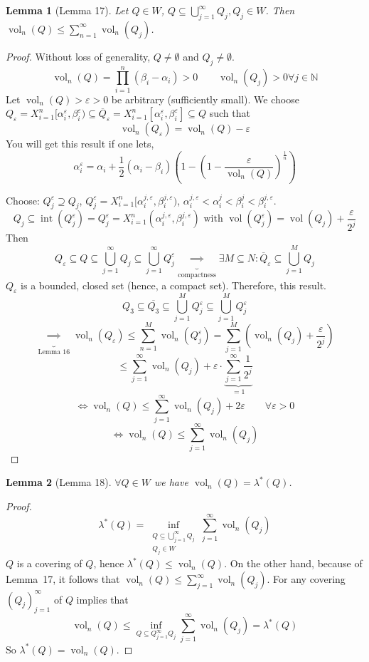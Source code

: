 \documentclass{article}
\newtheorem{lemma}{Lemma}  \numberwithin{lemma}{section}
\DeclareMathOperator{\vol}{vol}  %
\begin{document}
\begin{lemma}[Lemma 17]
  Let $Q \in W$, $Q \subseteq \bigcup_{j=1}^\infty Q_j, Q_j \in W$.
  Then $\vol_n(Q) \leq \sum_{n=1}^{\infty} \vol_n(Q_j)$.
\end{lemma}

\begin{proof}
  Without loss of generality, $Q \neq \emptyset$ and $Q_j \neq \emptyset$.
  \[ \vol_n(Q) = \prod_{i=1}^n (\beta_i - \alpha_i) > 0 \qquad \vol_n(Q_j) > 0 \forall j \in \mathbb N \]
  Let $\vol_n(Q) > \varepsilon > 0$ be arbitrary (sufficiently small).
  We choose $Q_{\varepsilon} = X_{i=1}^n [\alpha_i^\varepsilon, \beta_i^\varepsilon) \subseteq \overline{Q}_\varepsilon = X_{i=1}^n [\alpha_i^\varepsilon, \beta_i^\varepsilon] \subseteq Q$ such that
  \[ \vol_n(Q_\varepsilon) = \vol_n(Q) - \varepsilon \]
  You will get this result if one lets,
  \[ \alpha_i^\varepsilon = \alpha_i + \frac12(\alpha_i - \beta_i)\left(1 - (1 - \frac{\varepsilon}{\vol_n(Q)})^\frac1n\right) \]

  Choose: $Q_j^\varepsilon \supseteq Q_j$, $Q_j^\varepsilon = X_{i=1}^n [\alpha_i^{j,\varepsilon}, \beta_i^{j,\varepsilon})$, $\alpha_i^{j,\varepsilon} < \alpha_i^j < \beta_i^j < \beta_i^{j,\varepsilon}$.
  \[ Q_j \subseteq \operatorname{int}(Q_j^\varepsilon) = Q_j^\varepsilon = X_{i=1}^n (\alpha_i^{j,\varepsilon}, \beta_i^{j,\varepsilon}) \text{ with } \vol(Q_j^\varepsilon) = \vol(Q_j) + \frac{\varepsilon}{2^j} \]
  Then
  \[
    Q_\varepsilon \subseteq Q \subseteq \bigcup_{j=1}^\infty Q_j \subseteq \bigcup_{j=1}^\infty Q_j^\varepsilon
    \underbrace{\implies}_{\text{compactness}} \exists M \subseteq N: \overline{Q}_\varepsilon \subseteq \bigcup_{j=1}^M Q_j
  \]
  $Q_\varepsilon$ is a bounded, closed set (hence, a compact set). Therefore, this result.
  \[ Q_3 \subseteq \overline{Q_3} \subseteq \bigcup_{j=1}^M Q_j^\varepsilon \subseteq \bigcup_{j=1}^M Q_j^\varepsilon \]
  \[ \underbrace{\implies}_{\text{Lemma 16}} \vol_n(Q_\varepsilon) \leq \sum_{n=1}^M \vol_n(Q_j^\varepsilon) = \sum_{j=1}^M \left(\vol_n(Q_j) + \frac{\varepsilon}{2^j}\right) \]
  \[ \leq \sum_{j=1}^\infty \vol_n(Q_j) + \varepsilon \cdot \underbrace{\sum_{j=1}^\infty \frac{1}{2^j}}_{=1} \]
  \[ \Leftrightarrow \vol_n(Q) \leq \sum_{j=1}^{\infty} \vol_n(Q_j) + 2\varepsilon \qquad \forall \varepsilon > 0 \]
  \[ \Leftrightarrow \vol_n(Q) \leq \sum_{j=1}^\infty \vol_n(Q_j) \]
\end{proof}

\begin{lemma}[Lemma 18]
  $\forall Q \in W$ we have $\vol_n(Q) = \lambda^*(Q)$.
\end{lemma}
\begin{proof}
  \[ \lambda^*(Q) = \inf_{\substack{Q \subseteq \bigcup_{j=1}^\infty Q_j \\ Q_j \in W}} \sum_{j=1}^\infty \vol_n(Q_j) \]
  $Q$ is a covering of $Q$, hence $\lambda^*(Q) \leq \vol_n(Q)$.
  On the other hand, because of Lemma~17, it follows that $\vol_n(Q) \leq \sum_{j=1}^\infty \vol_n(Q_j)$.
  For any covering $(Q_j)_{j=1}^\infty$ of $Q$ implies that
  \[ \vol_n(Q) \leq \inf_{Q \subseteq Q_{j=1}^\infty Q_j} \sum_{j=1}^\infty \vol_n(Q_j) = \lambda^*(Q) \]
  So $\lambda^*(Q) = \vol_n(Q)$.
\end{proof}
\end{document}
